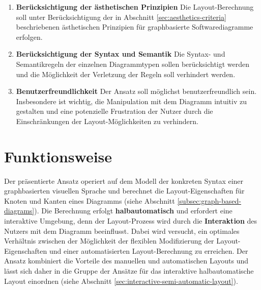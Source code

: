 \begin{enumerate}[label={K.\arabic*}]
\item
\label{req:aesthetics-criteria}
\textbf{Berücksichtigung der ästhetischen Prinzipien}
Die Layout-Berechnung soll unter Berücksichtigung der in Abschnitt \ref{sec:aesthetics-criteria} beschriebenen ästhetischen Prinzipien für graphbasierte Softwarediagramme erfolgen.

\item
\label{req:syntax-and-semantics}
\textbf{Berücksichtigung der Syntax und Semantik}
Die Syntax- und Semantikregeln der einzelnen Diagrammtypen sollen berücksichtigt werden und die Möglichkeit der Verletzung der Regeln soll verhindert werden.

\item
\label{req:user-friendly}
\textbf{Benutzerfreundlichkeit}
Der Ansatz soll möglichst benutzerfreundlich sein. Insbesondere ist wichtig, die Manipulation mit dem Diagramm intuitiv zu gestalten und eine potenzielle Frustration der Nutzer durch die Einschränkungen der Layout-Möglichkeiten zu verhindern.

\end{enumerate}

\section{Funktionsweise}
\label{sec:functionality-overview}

Der präsentierte Ansatz operiert auf dem Modell der konkreten Syntax einer graphbasierten visuellen Sprache und berechnet die Layout-Eigenschaften für Knoten und Kanten eines Diagramms (siehe Abschnitt \ref{subsec:graph-based-diagrams}). Die Berechnung erfolgt \textbf{halbautomatisch} und erfordert eine interaktive Umgebung, denn der Layout-Prozess wird durch die \textbf{Interaktion} des Nutzers mit dem Diagramm beeinflusst. Dabei wird versucht, ein optimales Verhältnis zwischen der Möglichkeit der flexiblen Modifizierung der Layout-Eigenschaften und einer automatisierten Layout-Berechnung zu erreichen. Der Ansatz kombiniert die Vorteile des manuellen und automatischen Layouts und lässt sich daher in die Gruppe der Ansätze für das interaktive halbautomatische Layout einordnen (siehe Abschnitt \ref{sec:interactive-semi-automatic-layout}).

